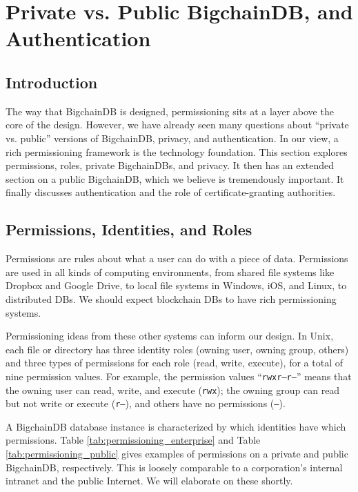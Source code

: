 \section{Private vs. Public BigchainDB, and Authentication}\label{sec:permissioning}

\subsection{Introduction}
The way that BigchainDB is designed, permissioning sits at a layer above the core of the design. 
However, we have already seen many questions about “private vs. public” versions of BigchainDB, privacy, and authentication. 
In our view, a rich permissioning framework is the technology foundation. 
This section explores permissions, roles, private BigchainDBs, and privacy. 
It then has an extended section on a public BigchainDB, which we believe is tremendously important. 
It finally discusses authentication and the role of certificate-granting authorities.

\subsection{Permissions, Identities, and Roles}
Permissions are rules about what a user can do with a piece of data. 
Permissions are used in all kinds of computing environments, from shared file systems like Dropbox and Google Drive, to local file systems in Windows, iOS, and Linux, to distributed DBs. 
We should expect blockchain DBs to have rich permissioning systems.

Permissioning ideas from these other systems can inform our design. 
In Unix, each file or directory has three identity roles (owning user, owning group, others) and three types of permissions for each role (read, write, execute), for a total of nine permission values. 
For example, the permission values ``\texttt{rwxr--r---}'' means that the owning user can read, write, and execute (\texttt{rwx}); the owning group can read but not write or execute (\texttt{r--}), and others have no permissions (\texttt{---}).

A BigchainDB database instance is characterized by which identities have which permissions. 
Table \ref{tab:permissioning_enterprise} and Table \ref{tab:permissioning_public} gives examples of permissions on a private and public BigchainDB, respectively. 
This is loosely comparable to a corporation’s internal intranet and the public Internet. 
We will elaborate on these shortly.

